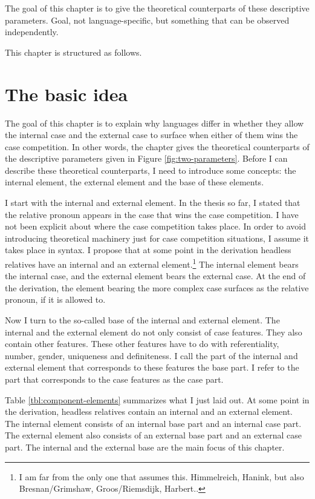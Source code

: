 The goal of this chapter is to give the theoretical counterparts of these descriptive parameters. Goal, not language-specific, but something that can be observed independently.

This chapter is structured as follows.


\section{The basic idea}

The goal of this chapter is to explain why languages differ in whether they allow the internal case and the external case to surface when either of them wins the case competition. In other words, the chapter gives the theoretical counterparts of the descriptive parameters given in Figure \ref{fig:two-parameters}. Before I can describe these theoretical counterparts, I need to introduce some concepts: the internal element, the external element and the base of these elements.

I start with the internal and external element. In the thesis so far, I stated that the relative pronoun appears in the case that wins the case competition. I have not been explicit about where the case competition takes place. In order to avoid introducing theoretical machinery just for case competition situations, I assume it takes place in syntax. I propose that at some point in the derivation headless relatives have an internal and an external element.\footnote{
I am far from the only one that assumes this. Himmelreich, Hanink, but also Bresnan/Grimshaw, Groos/Riemsdijk, Harbert..
} The internal element bears the internal case, and the external element bears the external case. At the end of the derivation, the element bearing the more complex case surfaces as the relative pronoun, if it is allowed to.

Now I turn to the so-called base of the internal and external element. The internal and the external element do not only consist of case features. They also contain other features. These other features have to do with referentiality, number, gender, uniqueness and definiteness. I call the part of the internal and external element that corresponds to these features the base part. I refer to the part that corresponds to the case features as the case part.

Table \ref{tbl:component-elements} summarizes what I just laid out. At some point in the derivation, headless relatives contain an internal and an external element. The internal element consists of an internal base part and an internal case part. The external element also consists of an external base part and an external case part. The internal and the external base are the main focus of this chapter.

